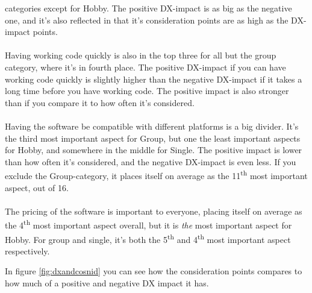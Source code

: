 \documentclass{article}
\begin{document}
categories except for Hobby. The positive DX-impact is as big as the
negative one, and it's also reflected in that it's consideration points
are as high as the DX-impact points.
\\ \\
Having working code quickly is also in the top three for all but the
group category, where it's in fourth place. The positive DX-impact if
you can have working code quickly is slightly higher than the negative
DX-impact if it takes a long time before you have working code. The
positive impact is also stronger than if you compare it to how often
it's considered.
\\ \\
Having the software be compatible with different platforms is a big
divider. It's the third most important aspect for Group, but one the
least important aspects for Hobby, and somewhere in the middle for
Single. The positive impact is lower than how often it's considered, and
the negative DX-impact is even less. If you exclude the Group-category,
it places itself on average as the 11\textsuperscript{th} most important
aspect, out of 16.
\\ \\
The pricing of the software is important to everyone, placing itself on
average as the 4\textsuperscript{th} most important aspect overall, but it is \textit{the}
most important aspect for Hobby. For group and single, it's both the
5\textsuperscript{th}  and 4\textsuperscript{th}  most important aspect respectively.

In figure \ref{fig:dxandcosnid} you can see how the consideration points compares to how much of a positive and negative DX impact it has.
\end{document}
